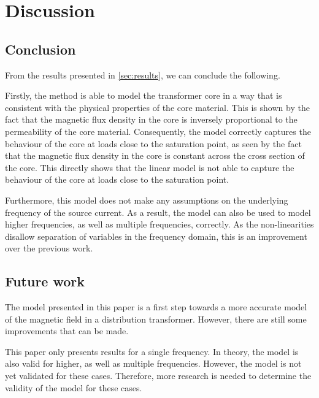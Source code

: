 \chapter{Discussion} \label{sec:discussion}


\section{Conclusion}
From the results presented in \autoref{sec:results}, we can conclude the following.

Firstly, the method is able to model the transformer core in a way that is consistent with the physical properties of the core material. This is shown by the fact that the magnetic flux density in the core is inversely proportional to the permeability of the core material. Consequently, the model correctly captures the behaviour of the core at loads close to the saturation point, as seen by the fact that the magnetic flux density in the core is constant across the cross section of the core. This directly shows that the linear model is not able to capture the behaviour of the core at loads close to the saturation point.

Furthermore, this model does not make any assumptions on the underlying frequency of the source current. As a result, the model can also be used to model higher frequencies, as well as multiple frequencies, correctly. As the non-linearities disallow separation of variables in the frequency domain, this is an improvement over the previous work. 

\section{Future work}
The model presented in this paper is a first step towards a more accurate model of the magnetic field in a distribution transformer. However, there are still some improvements that can be made.
\vspace{5pt}

\noindent This paper only presents results for a single frequency. In theory, the model is also valid for higher, as well as multiple frequencies. However, the model is not yet validated for these cases. Therefore, more research is needed to determine the validity of the model for these cases.

